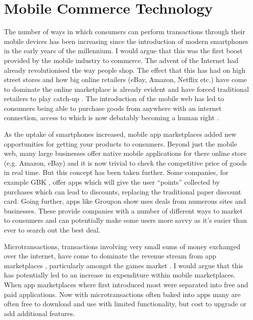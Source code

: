 \documentclass[paper=a4, fontsize=12pt]{scrartcl}	%
\numberwithin{equation}{section}															%
\numberwithin{figure}{section}																%
\numberwithin{table}{section}
\begin{document}
\section{Mobile Commerce Technology}

The number of ways in which consumers can perform transactions through their mobile devices has been increasing since the introduction of modern smartphones in the early years of the millennium. I would argue that this was the first boost provided by the mobile industry to commerce. The advent of the Internet had already revolutionised the way people shop. The effect that this has had on high street stores and how big online retailers (eBay, Amazon, Netflix etc.) have come to dominate the online marketplace is already evident \cite{telegraph2015internet, telegraph2015online, quartz2016online} and have forced traditional retailers to play catch-up \cite{forbes2016how}. The introduction of the mobile web has led to consumers being able to purchase goods from anywhere with an internet connection, access to which is now debatably becoming a human right \cite{larue2011report}. 

As the uptake of smartphones increased, mobile app marketplaces added new opportunities for getting your products to consumers. Beyond just the mobile web, many large businesses offer native mobile applications for there online store (e.g. Amazon, eBay) and it is now trivial to check the competitive price of goods in real time. But this concept has been taken further. Some companies, for example GBK \cite{gbk2016app}, offer apps which will give the user ``points'' collected by purchases which can lead to discounts, replacing the traditional paper discount card. Going further, apps like Groupon \cite{groupon2016app} show uses deals from numerous sites and businesses. These provide companies with a number of different ways to market to consumers and can potentially make some users more savvy as it's easier than ever to search out the best deal.

Microtransactions, transactions involving very small sums of money exchanged over the internet, have come to dominate the revenue stream from app marketplaces \cite{venture2014report}, particularly amongst the games market \cite{mashable2015micro, slice2016hardly}. I would argue that this has potentially led to an increase in expenditure within mobile marketplaces. When app marketplaces where first introduced most were separated into free and paid applications. Now with microtransactions often baked into apps many are often free to download and use with limited functionality, but cost to upgrade or add additional features.
\end{document}
